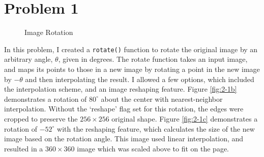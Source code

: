 \documentclass[aps,letterpaper,10pt]{article}
\newcommand{\ttt}{\texttt}
\begin{document}
\section{Problem 1}
\begin{figure}[!h]
\centering
{}\hfill
{}\hfill
{}
\caption{Image Rotation}
\label{2-1}
\end{figure}
In this problem, I created a \ttt{rotate()} function to rotate the original image by an arbitrary angle, $\theta$, given in degrees.  The rotate function takes an input image, and maps its points to those in a new image by rotating a point in the new image by $-\theta$ and then interpolating the result.  I allowed a few options, which included the interpolation scheme, and an image reshaping feature.  Figure \ref{fig:2-1b} demonstrates a rotation of $80^\circ$ about the center with nearest-neighbor interpolation.  Without the `reshape' flag set for this rotation, the edges were cropped to preserve the $256\times256$ original shape. Figure \ref{fig:2-1c} demonstrates a rotation of $-52^\circ$  with the reshaping feature, which calculates the size of the new image based on the rotation angle.  This image used linear interpolation, and resulted in a $360\times360$ image which was scaled above to fit on the page.
\end{document}
